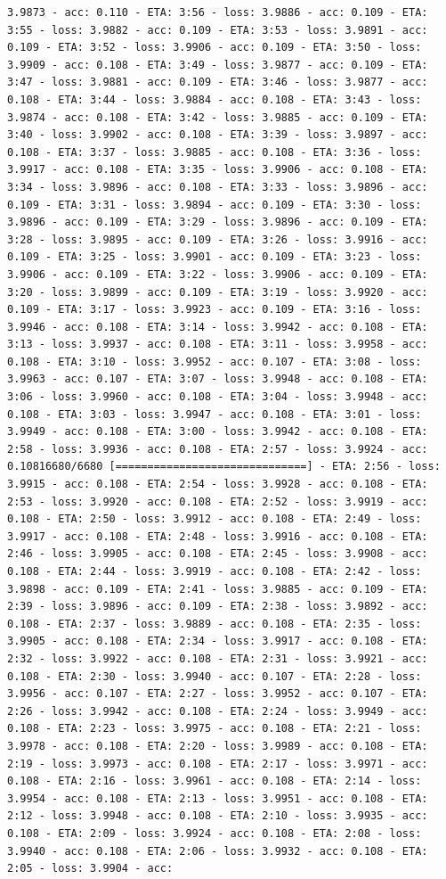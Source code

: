 \documentclass[11pt]{article}
\begin{document}
\begin{Verbatim}[commandchars=\\\{\}]
3.9873 - acc: 0.110 - ETA: 3:56 - loss: 3.9886 - acc: 0.109 - ETA: 3:55 - loss: 3.9882 - acc: 0.109 - ETA: 3:53 - loss: 3.9891 - acc: 0.109 - ETA: 3:52 - loss: 3.9906 - acc: 0.109 - ETA: 3:50 - loss: 3.9909 - acc: 0.108 - ETA: 3:49 - loss: 3.9877 - acc: 0.109 - ETA: 3:47 - loss: 3.9881 - acc: 0.109 - ETA: 3:46 - loss: 3.9877 - acc: 0.108 - ETA: 3:44 - loss: 3.9884 - acc: 0.108 - ETA: 3:43 - loss: 3.9874 - acc: 0.108 - ETA: 3:42 - loss: 3.9885 - acc: 0.109 - ETA: 3:40 - loss: 3.9902 - acc: 0.108 - ETA: 3:39 - loss: 3.9897 - acc: 0.108 - ETA: 3:37 - loss: 3.9885 - acc: 0.108 - ETA: 3:36 - loss: 3.9917 - acc: 0.108 - ETA: 3:35 - loss: 3.9906 - acc: 0.108 - ETA: 3:34 - loss: 3.9896 - acc: 0.108 - ETA: 3:33 - loss: 3.9896 - acc: 0.109 - ETA: 3:31 - loss: 3.9894 - acc: 0.109 - ETA: 3:30 - loss: 3.9896 - acc: 0.109 - ETA: 3:29 - loss: 3.9896 - acc: 0.109 - ETA: 3:28 - loss: 3.9895 - acc: 0.109 - ETA: 3:26 - loss: 3.9916 - acc: 0.109 - ETA: 3:25 - loss: 3.9901 - acc: 0.109 - ETA: 3:23 - loss: 3.9906 - acc: 0.109 - ETA: 3:22 - loss: 3.9906 - acc: 0.109 - ETA: 3:20 - loss: 3.9899 - acc: 0.109 - ETA: 3:19 - loss: 3.9920 - acc: 0.109 - ETA: 3:17 - loss: 3.9923 - acc: 0.109 - ETA: 3:16 - loss: 3.9946 - acc: 0.108 - ETA: 3:14 - loss: 3.9942 - acc: 0.108 - ETA: 3:13 - loss: 3.9937 - acc: 0.108 - ETA: 3:11 - loss: 3.9958 - acc: 0.108 - ETA: 3:10 - loss: 3.9952 - acc: 0.107 - ETA: 3:08 - loss: 3.9963 - acc: 0.107 - ETA: 3:07 - loss: 3.9948 - acc: 0.108 - ETA: 3:06 - loss: 3.9960 - acc: 0.108 - ETA: 3:04 - loss: 3.9948 - acc: 0.108 - ETA: 3:03 - loss: 3.9947 - acc: 0.108 - ETA: 3:01 - loss: 3.9949 - acc: 0.108 - ETA: 3:00 - loss: 3.9942 - acc: 0.108 - ETA: 2:58 - loss: 3.9936 - acc: 0.108 - ETA: 2:57 - loss: 3.9924 - acc: 0.10816680/6680 [==============================] - ETA: 2:56 - loss: 3.9915 - acc: 0.108 - ETA: 2:54 - loss: 3.9928 - acc: 0.108 - ETA: 2:53 - loss: 3.9920 - acc: 0.108 - ETA: 2:52 - loss: 3.9919 - acc: 0.108 - ETA: 2:50 - loss: 3.9912 - acc: 0.108 - ETA: 2:49 - loss: 3.9917 - acc: 0.108 - ETA: 2:48 - loss: 3.9916 - acc: 0.108 - ETA: 2:46 - loss: 3.9905 - acc: 0.108 - ETA: 2:45 - loss: 3.9908 - acc: 0.108 - ETA: 2:44 - loss: 3.9919 - acc: 0.108 - ETA: 2:42 - loss: 3.9898 - acc: 0.109 - ETA: 2:41 - loss: 3.9885 - acc: 0.109 - ETA: 2:39 - loss: 3.9896 - acc: 0.109 - ETA: 2:38 - loss: 3.9892 - acc: 0.108 - ETA: 2:37 - loss: 3.9889 - acc: 0.108 - ETA: 2:35 - loss: 3.9905 - acc: 0.108 - ETA: 2:34 - loss: 3.9917 - acc: 0.108 - ETA: 2:32 - loss: 3.9922 - acc: 0.108 - ETA: 2:31 - loss: 3.9921 - acc: 0.108 - ETA: 2:30 - loss: 3.9940 - acc: 0.107 - ETA: 2:28 - loss: 3.9956 - acc: 0.107 - ETA: 2:27 - loss: 3.9952 - acc: 0.107 - ETA: 2:26 - loss: 3.9942 - acc: 0.108 - ETA: 2:24 - loss: 3.9949 - acc: 0.108 - ETA: 2:23 - loss: 3.9975 - acc: 0.108 - ETA: 2:21 - loss: 3.9978 - acc: 0.108 - ETA: 2:20 - loss: 3.9989 - acc: 0.108 - ETA: 2:19 - loss: 3.9973 - acc: 0.108 - ETA: 2:17 - loss: 3.9971 - acc: 0.108 - ETA: 2:16 - loss: 3.9961 - acc: 0.108 - ETA: 2:14 - loss: 3.9954 - acc: 0.108 - ETA: 2:13 - loss: 3.9951 - acc: 0.108 - ETA: 2:12 - loss: 3.9948 - acc: 0.108 - ETA: 2:10 - loss: 3.9935 - acc: 0.108 - ETA: 2:09 - loss: 3.9924 - acc: 0.108 - ETA: 2:08 - loss: 3.9940 - acc: 0.108 - ETA: 2:06 - loss: 3.9932 - acc: 0.108 - ETA: 2:05 - loss: 3.9904 - acc: 
\end{Verbatim}
\end{document}
